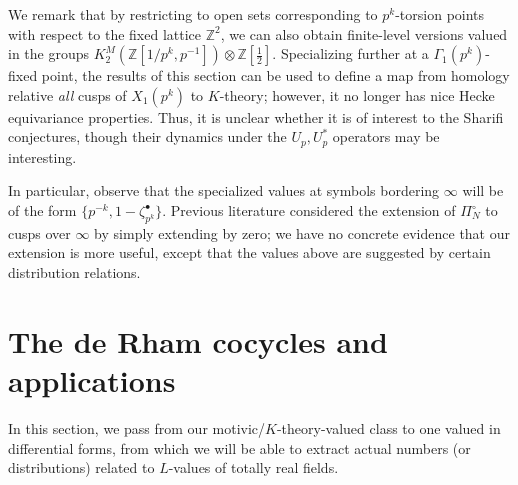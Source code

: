 \documentclass[10pt]{amsart}
\theoremstyle{definition}
\newcommand{\Z}{\mathbb{Z}}
\numberwithin{equation}{section}
\begin{document}
    We remark that by restricting to open sets corresponding to $p^k$-torsion points with respect to the fixed lattice $\Z^2$, we can also obtain finite-level versions valued in the groups $K_2^M(\Z[1/p^k,p^{-1}])\otimes \Z[\tfrac{1}{2}]$. Specializing further at a $\Gamma_1(p^k)$-fixed point, the results of this section can be used to define a map from homology relative \emph{all} cusps of $X_1(p^k)$ to $K$-theory; however, it no longer has nice Hecke equivariance properties. Thus, it is unclear whether it is of interest to the Sharifi conjectures, though their dynamics under the $U_p,U_p^*$ operators may be interesting. 
    
    In particular, observe that the specialized values at symbols bordering $\infty$ will be of the form $\{ p^{-k}, 1-\zeta_{p^k}^\bullet\}$. Previous literature considered the extension of $\Pi_N^\circ$ to cusps over $\infty$ by simply extending by zero; we have no concrete evidence that our extension is more useful, except that the values above are suggested by certain distribution relations.

    \section{The de Rham cocycles and applications} \label{section:derhamtheta}

    In this section, we pass from our motivic/$K$-theory-valued class to one valued in differential forms, from which we will be able to extract actual numbers (or distributions) related to $L$-values of totally real fields.
\end{document}
